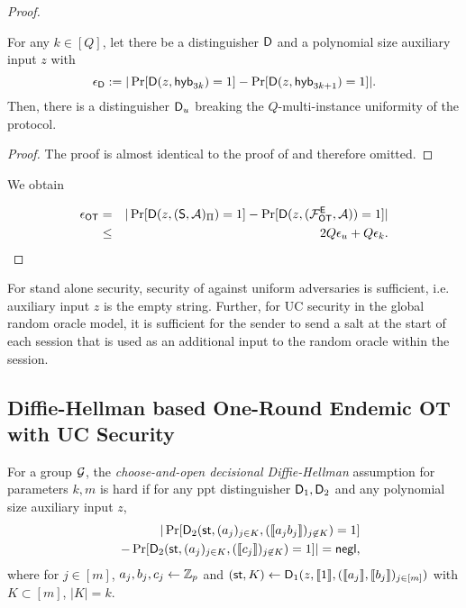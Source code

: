 \begin{proof}
\begin{claim}
For any $k\in[Q]$, let there be a distinguisher $\mathsf D$ and a polynomial size auxiliary input $z$ with
$$
\epsilon_{\mathsf D}:=|\Pr[\mathsf D(z,\mathsf{hyb}_{3k})=1] -\Pr[\mathsf D(z,\mathsf{hyb}_{3k+1})=1]|.
$$
Then, there is a distinguisher $\mathsf D_u$ breaking the $Q$-multi-instance uniformity of the \UKA protocol.
\end{claim}

\begin{proof}
The proof is almost identical to the proof of  and therefore omitted.
\pe
\end{proof}

We obtain

\begin{eqnarray*}
\epsilon_{\mathsf{OT}} &=&|\Pr[\mathsf D(z,(\mathsf{S}, \mathcal{A})_{\Pi})=1] -\Pr[\mathsf D(z,(\mathcal{F}_{\mathsf{OT}}^\mathsf{E},\mathcal{A}))=1]|\\
&\leq &2Q\epsilon_{u}+Q\epsilon_{k}.
\end{eqnarray*}
\pe
\end{proof}


\begin{remark}
For stand alone security, security of \UKA against uniform adversaries is sufficient, i.e. auxiliary input $z$ is the empty string. Further, for UC security in the global random oracle model, it is sufficient for the sender to send a salt at the start of each session that is used as an additional input to the random oracle within the session. 
\end{remark}







\subsection{Diffie-Hellman based One-Round Endemic OT with UC Security }\label{sec:ddhProof}



\begin{definition}\label{def:CODDH}
	For a group $\mathcal{G}$, the \emph{choose-and-open decisional Diffie-Hellman} assumption for parameters $k,m$ is hard if for any ppt distinguisher $\mathsf D_1,\mathsf D_2$ and any polynomial size auxiliary input $z$,
	\begin{eqnarray*}
		&&|\Pr[ \mathsf D_2(\mathsf{st},(a_j)_{j\in K},(\llbracket a_{j}b_{j}\rrbracket)_{j\not\in K})=1]\\
		&&-\Pr[ \mathsf D_2(\mathsf{st},(a_j)_{j\in K},(\llbracket c_{j}\rrbracket)_{j\not\in K})=1]|=\mathsf{negl},
	\end{eqnarray*}
	where for $j\in[m]$, $a_j,b_j,c_j\leftarrow\mathbb Z_p$ and $(\mathsf{st}, K)\leftarrow\mathsf D_1(z, \llbracket 1\rrbracket, (\llbracket a_j\rrbracket,\llbracket b_j\rrbracket)_{j\in [m]})$ with $K\subset[m]$, $|K|=k$.
\end{definition}

